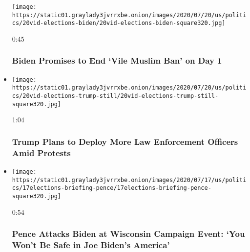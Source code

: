 \begin{itemize}
  \texttt{[image: https://static01.graylady3jvrrxbe.onion/images/2020/07/20/us/politics/20vid-elections-biden/20vid-elections-biden-square320.jpg]}

  0:45

  \hypertarget{biden-promises-to-end-vile-muslim-ban-on-day-1}{%
  \subsubsection{Biden Promises to End `Vile Muslim Ban' on Day
  1}\label{biden-promises-to-end-vile-muslim-ban-on-day-1}}
\item
  \href{https://www.nytimes3xbfgragh.onion/video/us/100000007247868/trump-deploy-federal-agents.html?action=click\&module=video-series-bar\&region=header\&pgtype=Article\&playlistId=video/us-politics}{}

  \texttt{[image: https://static01.graylady3jvrrxbe.onion/images/2020/07/20/us/politics/20vid-elections-trump-still/20vid-elections-trump-still-square320.jpg]}

  1:04

  \hypertarget{trump-plans-to-deploy-more-law-enforcement-officers-amid-protests}{%
  \subsubsection{Trump Plans to Deploy More Law Enforcement Officers
  Amid
  Protests}\label{trump-plans-to-deploy-more-law-enforcement-officers-amid-protests}}
\item
  \href{https://www.nytimes3xbfgragh.onion/video/us/100000007244976/pence-calls-out-biden-wisconsin.html?action=click\&module=video-series-bar\&region=header\&pgtype=Article\&playlistId=video/us-politics}{}

  \texttt{[image: https://static01.graylady3jvrrxbe.onion/images/2020/07/17/us/politics/17elections-briefing-pence/17elections-briefing-pence-square320.jpg]}

  0:54

  \hypertarget{pence-attacks-biden-at-wisconsin-campaign-event-you-wont-be-safe-in-joe-bidens-america}{%
  \subsubsection{Pence Attacks Biden at Wisconsin Campaign Event: `You
  Won't Be Safe in Joe Biden's
  America'}\label{pence-attacks-biden-at-wisconsin-campaign-event-you-wont-be-safe-in-joe-bidens-america}}
\end{itemize}

